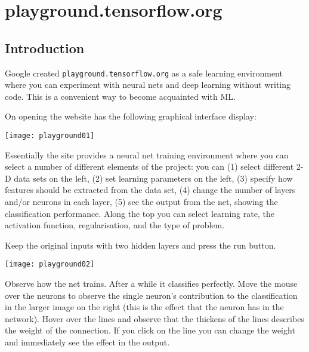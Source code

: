 
\chapter{playground.tensorflow.org}
\label{sec:playground.tensorflow.org}

\section{Introduction}

Google created \lstinline{playground.tensorflow.org}
\cite{GooglePlayground2019} as a safe learning environment where you can experiment with neural nets and deep learning without writing code.  This is a convenient way to become acquainted with \ac{ML}.

On opening the website has the following graphical interface display: 
 
\begin{figure*}[h]
\texttt{[image: playground01]}
\end{figure*}

Essentially the site provides a neural net training environment where you can select a number of different elements of the project: you can 
(1) select different \ac{2-D} data sets on the left, 
(2) set learning parameters on the left,
(3) specify how features  should be extracted from the data set,
(4) change the number of layers and/or neurons in each layer,
(5) see the output from the net, showing the classification performance.
Along the top you can select learning rate, the activation function, regularisation, and the type of problem. 

Keep the original inputs with two hidden layers and press the run button. 

\begin{figure*}[h]
\texttt{[image: playground02]}
\end{figure*}
\FloatBarrier

Observe how the net trains. After a while it classifies perfectly.  Move the mouse over the neurons to observe the single neuron's contribution to the classification in the larger image on the right (this is the effect that the neuron has in the network). Hover over the lines and observe that the thickens of the lines describes the weight of the connection. If you click on the line you can change the weight and immediately see the effect in the output. 

